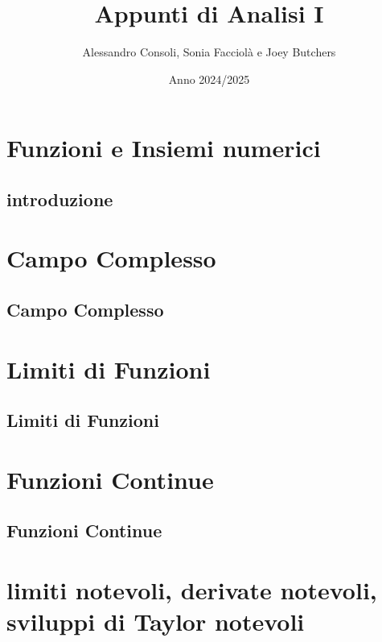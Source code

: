 \documentclass[a4paper,12pt]{report} %
\title{Appunti di Analisi I}
\author{Alessandro Consoli, Sonia Facciolà e Joey Butchers}
\date{Anno 2024/2025}
\begin{document}
    
    
    \tableofcontents


    \maketitle
    
\chapter{Funzioni e Insiemi numerici}

    \section{introduzione}

    

\chapter{Campo Complesso}

    \section{Campo Complesso}

    


\chapter{Limiti di Funzioni}

    \section{Limiti di Funzioni}

    



\chapter{Funzioni Continue}

    \section{Funzioni Continue}
    
    
    

\chapter{limiti notevoli, derivate notevoli, sviluppi di Taylor notevoli}




    
\end{document}
